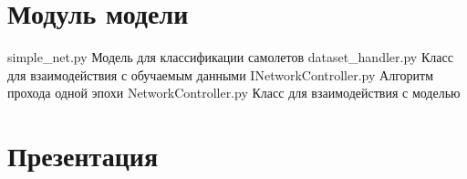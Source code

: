\begin{appendices}
	\chapter{Модуль модели}
	{simple_net.py} %
	{Модель для классификации самолетов} %
	{dataset_handler.py} %
	{Класс для взаимодействия с обучаемым данными} %
	{INetworkController.py} %
	{Алгоритм прохода одной эпохи} %
	{NetworkController.py} %
	{Класс для взаимодействия с моделью} %
	
	\chapter{Презентация}

\end{appendices}